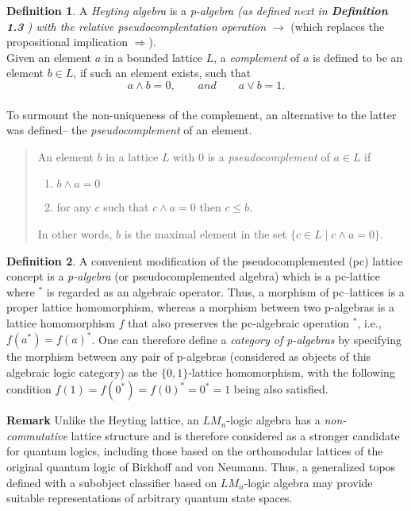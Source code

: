 \documentclass[12pt]{article}
\theoremstyle{plain}
\theoremstyle{definition}
\newtheorem{definition}{Definition}[section]
\numberwithin{equation}{section}
\begin{document}
\begin{definition}
A \emph{Heyting algebra} is a \emph{p-algebra (as defined next in \textbf{Definition 1.3} ) 
with the relative pseudocomplentation operation} $\to$ (which replaces the propositional implication $\Rightarrow$).\\
Given an element $a$ in a bounded lattice $L$, a \emph{complement} of $a$ is defined to be an element $b\in L$, if such an element exists, such that $$a\wedge b=0,\qquad{ and }\qquad a\vee b =1.$$ \\
To surmount the non-uniqueness of the complement, an alternative to the latter was defined-- 
the \emph{pseudocomplement} of an element. 
\begin{quote}
An element $b$ in a lattice $L$ with $0$ is a \emph{pseudocomplement} of $a\in L$ if 
\begin{enumerate}
\item $b\wedge a=0$
\item for any $c$ such that $c\wedge a=0$ then $c\le b$.
\end{enumerate}
In other words, $b$ is the maximal element in the set $\lbrace c\in L\mid c\wedge a=0\rbrace$.
\end{quote}
\end{definition}

\begin{definition}
A convenient modification of the pseudocomplemented (pc) lattice concept is  a \emph{p-algebra} 
(or pseudocomplemented algebra) which is a pc-lattice where $^*$ is regarded as an algebraic operator. 
Thus, a morphism  of pc--lattices is a proper lattice homomorphism, whereas a morphism between two p-algebras is 
a lattice homomorphism $f$ that also preserves the pc-algebraic operation $^*$, i.e.,  $f(a^*)= f(a)^*$. 
One can therefore define a \emph{category of p-algebras} by specifying the morphism between any pair of p-algebras 
(considered as objects of this algebraic logic category) as the $\lbrace 0,1\rbrace$-lattice homomorphism, with the following condition $f(1)=f(0^*)=f(0)^*=0^*=1$ being also satisfied. 
\end{definition}

\textbf{Remark}
Unlike the Heyting lattice, an $LM_n$-logic algebra has a \emph{non-commutative} lattice structure
and is therefore considered as a stronger candidate for quantum logics, including those based
on the orthomodular lattices of the original quantum logic of Birkhoff and von Neumann. Thus,
a generalized topos defined with a subobject classifier based on $LM_n$-logic algebra may
provide suitable representations of arbitrary quantum state spaces.  
\end{document}
